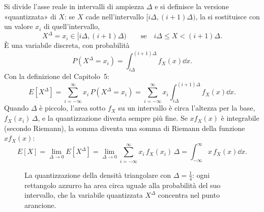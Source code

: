 \begin{dimostrazione}
 Si divide l'asse reale in intervalli di ampiezza $\Delta$ e si definisce la versione
«quantizzata» di $X$: se $X$ cade nell'intervallo $[i\Delta, (i+1)\Delta)$, la si sostituisce con un valore $x_i$ di
quell'intervallo,
\[ X^{\Delta} = x_i \in [i\Delta, (i+1)\Delta) \qquad \text{se} \quad i\Delta \leq X < (i+1)\Delta . \]
È una variabile discreta, con probabilità
\[ P(X^{\Delta} = x_i) = \int_{i\Delta}^{(i+1)\Delta} f_X(x) \dd x . \]
 Con la definizione del Capitolo~5:
\[ E[X^{\Delta}] = \sum_{i=-\infty}^{\infty} x_i\, P(X^{\Delta} = x_i) = \sum_{i=-\infty}^{\infty} x_i
   \int_{i\Delta}^{(i+1)\Delta} f_X(x) \dd x . \]
 Quando $\Delta$ è piccolo, l'area sotto $f_X$ su un intervallo è circa
l'altezza per la base, $f_X(x_i)\,\Delta$, e la quantizzazione diventa sempre più fine. Se $x f_X(x)$ è integrabile
(secondo Riemann), la somma diventa una somma di Riemann della funzione $x f_X(x)$:
\[ E[X] = \lim_{\Delta \to 0} E[X^{\Delta}] = \lim_{\Delta \to 0} \sum_{i=-\infty}^{\infty} x_i\, f_X(x_i)\,\Delta =
   \int_{-\infty}^{\infty} x\, f_X(x) \dd x . \]
\end{dimostrazione}

\begin{figure}[H]
\centering
{}
\caption{La quantizzazione della densità triangolare con $\Delta = \frac14$: ogni rettangolo azzurro ha area circa
uguale alla probabilità del suo intervallo, che la variabile quantizzata $X^{\Delta}$ concentra nel punto arancione.}
\end{figure}

